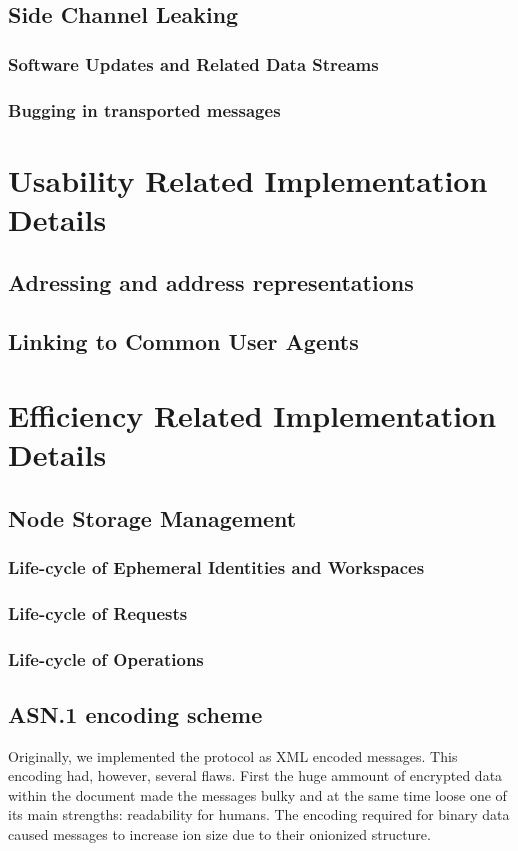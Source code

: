 \section{Side Channel Leaking}
\subsection{Software Updates and Related Data Streams}
\subsection{Bugging in transported messages}


\chapter{Usability Related Implementation Details}
\section{Adressing and address representations}
\section{Linking to Common User Agents}

\chapter{Efficiency Related Implementation Details}
\section{Node Storage Management}
\subsection{Life-cycle of Ephemeral Identities and Workspaces}
\subsection{Life-cycle of Requests}
\subsection{Life-cycle of Operations}
\section{ASN.1 encoding scheme}
Originally, we implemented the protocol as XML encoded messages. This encoding had, however, several flaws. First the huge ammount of encrypted data within the document made the messages bulky and at the same time loose one of its main strengths: readability for humans. The encoding required for binary data caused messages to increase ion size due to their onionized structure. 

